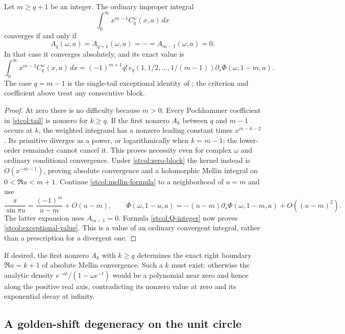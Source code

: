 \begin{theorem}
\label{stcol:exceptional}
Let $m\ge q+1$ be an integer.  The ordinary improper integral
\[
 \int_0^\infty x^{m-1}C_q^\omega(x,a)\,dx
\]
converges if and only if
\begin{equation}\label{stcol:zero-block}
 A_q(\omega,a)=A_{q+1}(\omega,a)=\cdots=A_{m-1}(\omega,a)=0.
\end{equation}
In that case it converges absolutely, and its exact value is
\begin{equation}\label{stcol:exceptional-value}
 \boxed{\displaystyle
 \int_0^\infty x^{m-1}C_q^\omega(x,a)\,dx
   =(-1)^{m+1}q!\,e_q(1,1/2,\ldots,1/(m-1))
                \partial_s\Phi(\omega,1-m,a).}
\end{equation}
The case $q=m-1$ is the single-tail exceptional identity of
\cite{stcol:report}; the criterion and coefficient above treat any
consecutive block.
\end{theorem}
\begin{proof}
At zero there is no difficulty because $m>0$.  Every Pochhammer
coefficient in \eqref{stcol:tail} is nonzero for $k\ge q$.
If the first nonzero $A_k$ between $q$ and $m-1$ occurs at $k$,
the weighted integrand has a nonzero leading constant times
$x^{m-k-2}$.  Its primitive diverges as a power, or logarithmically
when $k=m-1$; the lower-order remainder cannot cancel it.  This
proves necessity even for complex $\omega$ and ordinary conditional
convergence.  Under \eqref{stcol:zero-block} the kernel instead is
$O(x^{-m-1})$, proving absolute convergence and a holomorphic Mellin
integral on $0<\Re u<m+1$.  Continue
\eqref{stcol:mellin-formula} to a neighborhood of $u=m$ and use
\[
 \frac{\pi}{\sin\pi u}=\frac{(-1)^m}{u-m}+O(u-m),\qquad
 \Phi(\omega,1-u,a)
  =-(u-m)\partial_s\Phi(\omega,1-m,a)+O((u-m)^2).
\]
The latter expansion uses $A_{m-1}=0$.  Formula
\eqref{stcol:Q-integer} now proves
\eqref{stcol:exceptional-value}.  This is a value of an ordinary
convergent integral, rather than a prescription for a divergent one.
\end{proof}

If desired, the first nonzero $A_k$ with $k\ge q$ determines the exact
right boundary $\Re u=k+1$ of absolute Mellin convergence.  Such a
$k$ must exist: otherwise the analytic density
$e^{-at}/(1-\omega e^{-t})$ would be a polynomial near zero and hence
along the positive real axis, contradicting its nonzero value at zero
and its exponential decay at infinity.

\subsection{A golden-shift degeneracy on the unit circle}

